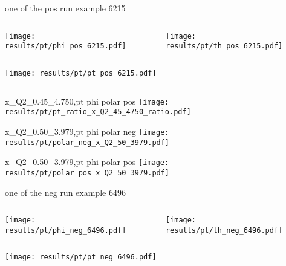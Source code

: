 \begin{frame}{one of the pos run example 6215}
\begin{columns}
\begin{column}[T]{0.5\textwidth}
\texttt{[image: results/pt/phi\_pos\_6215.pdf]}
\end{column}
\begin{column}[T]{0.5\textwidth}
\texttt{[image: results/pt/th\_pos\_6215.pdf]}
\end{column}
\end{columns}
\begin{columns}
\begin{column}[T]{0.5\textwidth}
\texttt{[image: results/pt/pt\_pos\_6215.pdf]}
\end{column}
\begin{column}[T]{0.5\textwidth}
\end{column}
\end{columns}
\end{frame}
\begin{frame}{x\_Q2\_0.45\_4.750,pt phi polar pos}
\texttt{[image: results/pt/pt\_ratio\_x\_Q2\_45\_4750\_ratio.pdf]}
\end{frame}
\begin{frame}{x\_Q2\_0.50\_3.979,pt phi polar neg}
\texttt{[image: results/pt/polar\_neg\_x\_Q2\_50\_3979.pdf]}
\end{frame}
\begin{frame}{x\_Q2\_0.50\_3.979,pt phi polar pos}
\texttt{[image: results/pt/polar\_pos\_x\_Q2\_50\_3979.pdf]}
\end{frame}
\begin{frame}{one of the neg run example 6496}
\begin{columns}
\begin{column}[T]{0.5\textwidth}
\texttt{[image: results/pt/phi\_neg\_6496.pdf]}
\end{column}
\begin{column}[T]{0.5\textwidth}
\texttt{[image: results/pt/th\_neg\_6496.pdf]}
\end{column}
\end{columns}
\texttt{[image: results/pt/pt\_neg\_6496.pdf]}
\end{frame}
